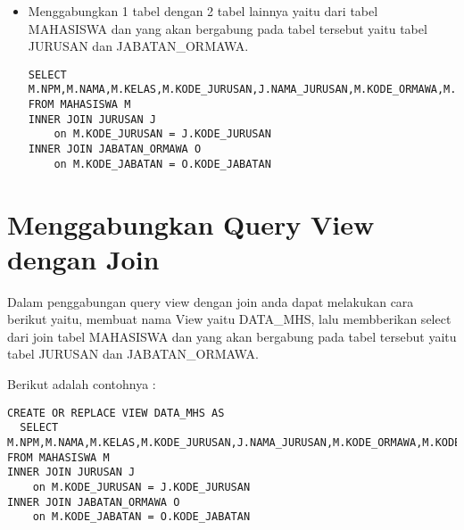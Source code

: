 \begin{itemize}
    \item Menggabungkan 1 tabel dengan 2 tabel lainnya yaitu dari tabel MAHASISWA dan yang akan bergabung pada tabel tersebut yaitu tabel JURUSAN dan JABATAN\_ORMAWA.
    \begin{lstlisting}
SELECT M.NPM,M.NAMA,M.KELAS,M.KODE_JURUSAN,J.NAMA_JURUSAN,M.KODE_ORMAWA,M.KODE_JABATAN,O.JABATAN,M.NO_TELP_MHS
FROM MAHASISWA M
INNER JOIN JURUSAN J
    on M.KODE_JURUSAN = J.KODE_JURUSAN
INNER JOIN JABATAN_ORMAWA O
    on M.KODE_JABATAN = O.KODE_JABATAN
    \end{lstlisting}
\end{itemize}

\section{Menggabungkan Query View dengan Join}
Dalam penggabungan query view dengan join anda dapat melakukan cara berikut yaitu, membuat nama View yaitu DATA\_MHS, lalu membberikan select dari join tabel MAHASISWA dan yang akan bergabung pada tabel tersebut yaitu tabel JURUSAN dan JABATAN\_ORMAWA.
\par Berikut adalah contohnya :
    \begin{lstlisting}
CREATE OR REPLACE VIEW DATA_MHS AS 
  SELECT M.NPM,M.NAMA,M.KELAS,M.KODE_JURUSAN,J.NAMA_JURUSAN,M.KODE_ORMAWA,M.KODE_JABATAN,O.JABATAN,M.NO_TELP_MHS
FROM MAHASISWA M
INNER JOIN JURUSAN J
    on M.KODE_JURUSAN = J.KODE_JURUSAN
INNER JOIN JABATAN_ORMAWA O
    on M.KODE_JABATAN = O.KODE_JABATAN
    \end{lstlisting}